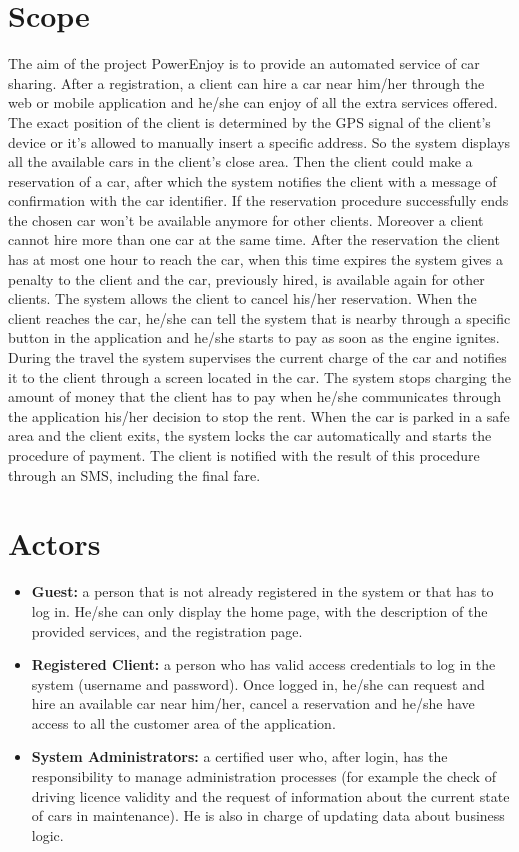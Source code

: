 \section{Scope}
The aim of the project PowerEnjoy is to provide an automated service of car sharing.
After a registration, a client can hire a car near him/her through the web or mobile application and he/she can enjoy of all the extra services offered.
The exact position of the client is determined by the GPS signal of the client’s device or it’s allowed to manually insert a specific address.
So the system displays all the available cars in the client’s close area.
Then the client could make a reservation of a car, after which the system notifies the client with a message of confirmation with the car identifier.
If the reservation procedure successfully ends the chosen car won’t be available anymore for other clients.
Moreover a client cannot hire more than one car at the same time.
After the reservation the client has at most one hour to reach the car, when this time expires the system gives a penalty to the client and the car, previously hired, is available again for other clients.
The system allows the client to cancel his/her reservation.
When the client reaches the car, he/she can tell the system that is nearby through a specific button in the application and he/she starts to pay as soon as the engine ignites.
During the travel the system supervises the current charge of the car and notifies it to the client through a screen located in the car.
The system stops charging the amount of money that the client has to pay when he/she communicates through the application his/her decision to stop the rent.
When the car is parked in a safe area and the client exits, the system locks the car automatically and starts the procedure of payment.
The client is notified with the result of this procedure through an SMS, including the final fare.

\section{Actors}
\begin{itemize}
\item \textbf{Guest:} a person that is not already registered in the system or that has to log in.
He/she can only display the home page, with the description of the provided services, and the registration page.
\item \textbf{Registered Client:} a person who has valid access credentials to log in the system (username and password).
Once logged in, he/she can request and hire an available car near him/her, cancel a reservation and he/she have access to all the customer area of the application.
\item \textbf{System Administrators:} a certified user who, after login, has the responsibility to manage administration processes (for example the check of driving licence validity and the request of information about the current state of cars in maintenance).
He is also in charge of updating data about business logic.

\end{itemize}
